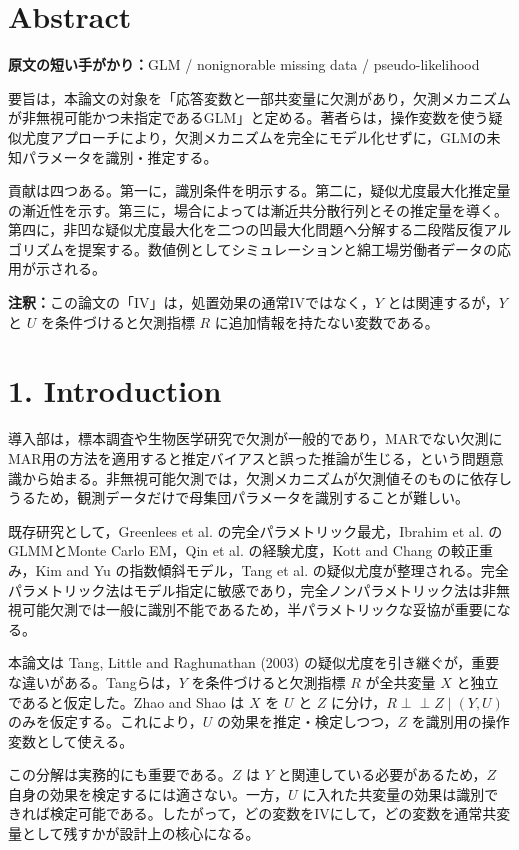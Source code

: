 \documentclass[dvipdfmx,autodetect-engine]{jsarticle}
\newcommand{\indep}{\mathrel{\perp\!\!\!\perp}}
\newcommand{\cue}[1]{\par\smallskip\noindent\textbf{原文の短い手がかり：}#1\par\smallskip}
\newcommand{\note}[1]{\par\smallskip\noindent\textbf{注釈：}#1\par\smallskip}
\begin{document}
\section{Abstract}

\cue{GLM / nonignorable missing data / pseudo-likelihood}

要旨は，本論文の対象を「応答変数と一部共変量に欠測があり，欠測メカニズムが非無視可能かつ未指定であるGLM」と定める。著者らは，操作変数を使う疑似尤度アプローチにより，欠測メカニズムを完全にモデル化せずに，GLMの未知パラメータを識別・推定する。

貢献は四つある。第一に，識別条件を明示する。第二に，疑似尤度最大化推定量の漸近性を示す。第三に，場合によっては漸近共分散行列とその推定量を導く。第四に，非凹な疑似尤度最大化を二つの凹最大化問題へ分解する二段階反復アルゴリズムを提案する。数値例としてシミュレーションと綿工場労働者データの応用が示される。

\note{この論文の「IV」は，処置効果の通常IVではなく，$Y$ とは関連するが，$Y$ と $U$ を条件づけると欠測指標 $R$ に追加情報を持たない変数である。}

\section{1. Introduction}

導入部は，標本調査や生物医学研究で欠測が一般的であり，MARでない欠測にMAR用の方法を適用すると推定バイアスと誤った推論が生じる，という問題意識から始まる。非無視可能欠測では，欠測メカニズムが欠測値そのものに依存しうるため，観測データだけで母集団パラメータを識別することが難しい。

既存研究として，Greenlees et al. の完全パラメトリック最尤，Ibrahim et al. のGLMMとMonte Carlo EM，Qin et al. の経験尤度，Kott and Chang の較正重み，Kim and Yu の指数傾斜モデル，Tang et al. の疑似尤度が整理される。完全パラメトリック法はモデル指定に敏感であり，完全ノンパラメトリック法は非無視可能欠測では一般に識別不能であるため，半パラメトリックな妥協が重要になる。

本論文は Tang, Little and Raghunathan (2003) の疑似尤度を引き継ぐが，重要な違いがある。Tangらは，$Y$ を条件づけると欠測指標 $R$ が全共変量 $X$ と独立であると仮定した。Zhao and Shao は $X$ を $U$ と $Z$ に分け，$R\indep Z\mid (Y,U)$ のみを仮定する。これにより，$U$ の効果を推定・検定しつつ，$Z$ を識別用の操作変数として使える。

この分解は実務的にも重要である。$Z$ は $Y$ と関連している必要があるため，$Z$ 自身の効果を検定するには適さない。一方，$U$ に入れた共変量の効果は識別できれば検定可能である。したがって，どの変数をIVにして，どの変数を通常共変量として残すかが設計上の核心になる。
\end{document}
